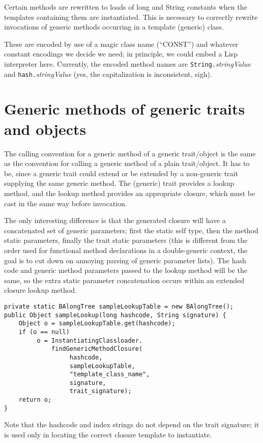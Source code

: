 \documentclass[11pt]{article}
\begin{document}
Certain methods are rewritten to loads of long and String constants when the templates containing them are instantiated.  This is necessary to correctly rewrite invocations of generic methods occurring in a template (generic) class.

These are encoded by use of a magic class name (``CONST'') and whatever constant encodings we decide we need; in principle, we could embed a Lisp interpreter here.  Currently, the encoded method names are \verb+String.+{\it stringValue} and \verb+hash.+{\it stringValue} (yes, the capitalization is inconsistent, sigh).

\section{Generic methods of generic traits and objects}

The calling convention for a generic method of a generic trait/object is the same as the convention for calling a generic method of a plain trait/object.  It has to be, since a generic trait could extend or be extended by a non-generic trait supplying the same generic method.  The (generic) trait provides a lookup method, and the lookup method provides an appropriate closure, which must be cast in the same way before invocation.

The only interesting difference is that the generated closure will have a concatenated set of generic parameters; first the static self type, then the method static parameters, finally the trait static parameters (this is different from the order used for functional method declarations in a double-generic context, the goal is to cut down on annoying parsing of generic parameter lists).  The hash code and generic method parameters passed to the lookup method will be the same, so the extra static parameter concatenation occurs within an extended closure lookup method.

\begin{verbatim}
private static BAlongTree sampleLookupTable = new BAlongTree();
public Object sampleLookup(long hashcode, String signature) {
    Object o = sampleLookupTable.get(hashcode);
    if (o == null) 
         o = InstantiatingClassloader.
             findGenericMethodClosure(
                  hashcode,
                  sampleLookupTable,
                  "template_class_name",
                  signature,
                  trait_signature);
    return o;
}
\end{verbatim}

Note that the hashcode and index strings do not depend on the trait signature; it is used only in locating the correct closure template to instantiate.
\end{document}
